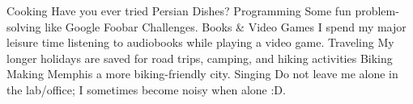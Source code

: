 



\begin{cvskills}
  \cvskill
    {Cooking} %
    {Have you ever tried Persian Dishes?} %
  \cvskill
    {Programming} %
    {Some fun problem-solving like Google Foobar Challenges.} %
  \cvskill
    {Books \& Video Games} %
    {I spend my major leisure time listening to audiobooks while playing a video game.} %
  \cvskill
    {Traveling} %
    {My longer holidays are saved for road trips, camping, and hiking activities} %
  \cvskill
    {Biking} %
    {Making Memphis a more biking-friendly city.} %
  \cvskill
    {Singing} %
    {Do not leave me alone in the lab/office; I sometimes become noisy when alone :D. } %
\end{cvskills}